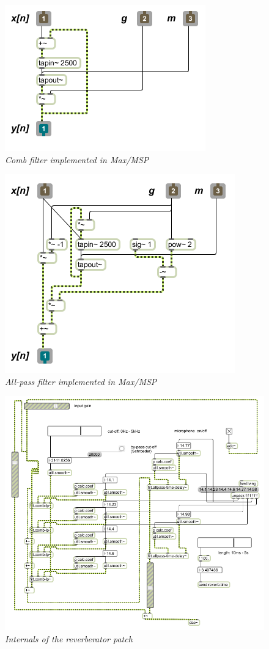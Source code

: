 \documentclass[12pt]{report}
\begin{document}
\pagebreak

\begin{figure}
  \centering
  \includegraphics[scale=0.5]{images/filt.comb.png}
  \caption{\emph{Comb filter implemented in Max/MSP}}
  \label{max:comb}
\end{figure}
\begin{figure}
  \centering
  \includegraphics[scale=0.5]{images/filt.allpass.png}
  \caption{\emph{All-pass filter implemented in Max/MSP}}
  \label{max:allpass}
\end{figure}
\begin{figure}
  \centering
  \includegraphics[scale=0.5]{images/guts.png}
  \caption{\emph{Internals of the reverberator patch}}
  \label{max:guts}
\end{figure}





%
%


\end{document}
